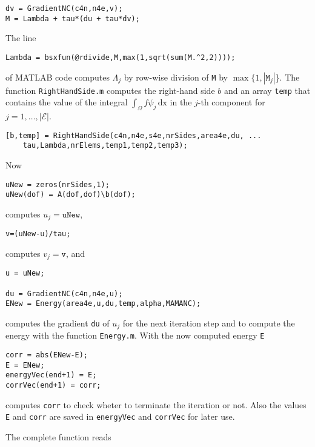 \begin{lstlisting}[frame=single,numbers=none]
dv = GradientNC(c4n,n4e,v);
M = Lambda + tau*(du + tau*dv);
\end{lstlisting}

The line
\begin{lstlisting}[frame=single,numbers=none]
Lambda = bsxfun(@rdivide,M,max(1,sqrt(sum(M.^2,2))));
\end{lstlisting}
of MATLAB code computes $\Lambda_j$ by row-wise division of \texttt{M} by 
$\operatorname{max}\{1,|\texttt{M}_j|$\}.
The function \texttt{RightHandSide.m} computes the right-hand side $b$ and 
an array \texttt{temp} that contains the value of the integral
$
\int_{\Omega} f\psi_j\,\mathrm{dx} 
$
in the $j$-th component for $j=1,\dots,|\mathcal E|$.
\begin{lstlisting}[frame=single,numbers=none]
[b,temp] = RightHandSide(c4n,n4e,s4e,nrSides,area4e,du, ...
    tau,Lambda,nrElems,temp1,temp2,temp3);     
\end{lstlisting}
Now
\begin{lstlisting}[frame=single,numbers=none]
uNew = zeros(nrSides,1);
uNew(dof) = A(dof,dof)\b(dof);
\end{lstlisting}
computes $u_j=\texttt{uNew}$,
\begin{lstlisting}[frame=single,numbers=none]
v=(uNew-u)/tau;        
\end{lstlisting}
computes $v_j=\texttt{v}$, and
\begin{lstlisting}[frame=single,numbers=none]
u = uNew;

du = GradientNC(c4n,n4e,u);
ENew = Energy(area4e,u,du,temp,alpha,MAMANC);
\end{lstlisting}
computes the gradient \texttt{du} of $u_{j}$ for the next iteration step and to compute
the energy with the function \texttt{Energy.m}.
With the now computed energy \texttt{E}
\begin{lstlisting}[frame=single,numbers=none]
corr = abs(ENew-E);
E = ENew;
energyVec(end+1) = E;
corrVec(end+1) = corr;
\end{lstlisting}
computes \texttt{corr} to check wheter to terminate the iteration or not. Also
the values \texttt{E} and \texttt{corr} are saved in \texttt{energyVec} and 
\texttt{corrVec} for later use.

The complete function reads



